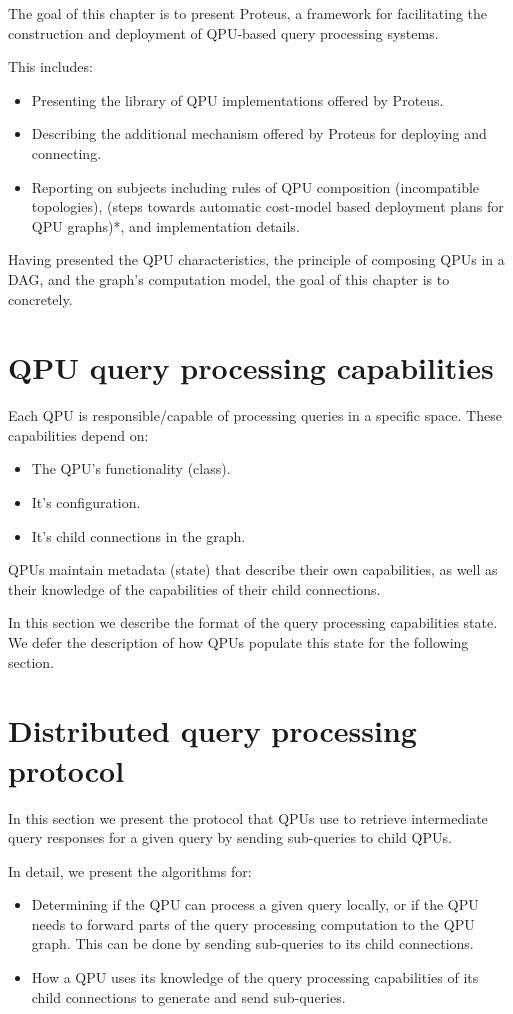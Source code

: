 The goal of this chapter is to present Proteus, a framework for facilitating
the construction and deployment of QPU-based query processing systems.

This includes:
\begin{itemize}
  \item Presenting the library of QPU implementations offered by Proteus.
  \item Describing the additional mechanism offered by Proteus for deploying and
  connecting.
  \item Reporting on subjects including rules of QPU composition (incompatible
  topologies), (steps towards automatic cost-model based deployment plans for
  QPU graphs)*, and implementation details.
\end{itemize}

Having presented the QPU characteristics, the principle of composing QPUs in a DAG, and the graph's computation model,
the goal of this chapter is to concretely.

\section{QPU query processing capabilities}

Each QPU is responsible/capable of processing queries in a specific space. These capabilities depend on:
\begin{itemize}
  \item The QPU's functionality (class).
  \item It's configuration.
  \item It's child connections in the graph.
\end{itemize}

QPUs maintain metadata (state) that describe their own capabilities, as well as their knowledge of the capabilities of
their child connections.

In this section we describe the format of the query processing capabilities state. We defer the description of how QPUs
populate this state for the following section.

\section{Distributed query processing protocol}
In this section we present the protocol that QPUs use to retrieve intermediate query responses for a given query by
sending sub-queries to child QPUs.

In detail, we present the algorithms for:
\begin{itemize}
  \item Determining if the QPU can process a given query locally, or if the QPU needs to forward parts of the query
  processing computation to the QPU graph.
  This can be done by sending sub-queries to its child connections.
  \item How a QPU uses its knowledge of the query processing capabilities of its child connections to generate and send
  sub-queries.
\end{itemize}

